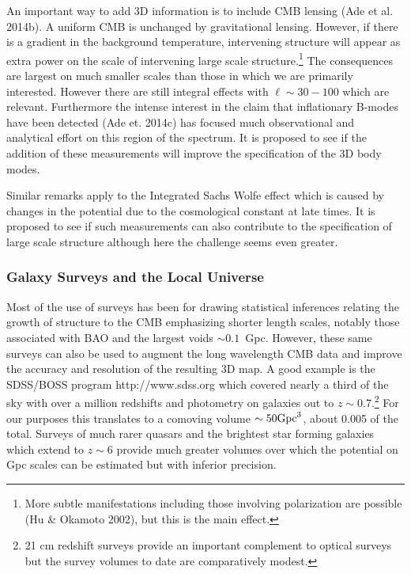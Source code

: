 \documentclass[psfig,11pt]{article}
\begin{document}
An important way to add 3D information is to include CMB lensing (Ade et al. 2014b). A uniform CMB is unchanged by gravitational lensing. However, if there is a gradient in the background temperature, intervening structure will appear as extra power on the scale of intervening large scale structure.\footnote{More subtle manifestations including those involving polarization are possible (Hu \& Okamoto 2002), but this is the main effect.} The consequences are largest on much smaller scales than those in which we are primarily interested. However there are still integral effects with $\ell\sim30-100$ which are relevant. Furthermore the intense interest in the claim that inflationary B-modes have been detected (Ade et. 2014c)  has focused much observational and analytical effort on this region of the spectrum. It is proposed to see if the addition of these measurements will improve the specification of the 3D body modes.

Similar remarks apply to the Integrated Sachs Wolfe effect which is caused by changes in the potential due to the cosmological constant at late times. It is proposed to see if such measurements can also contribute to the specification of large scale structure although here the challenge seems even greater.

\subsubsection{Galaxy Surveys and the Local Universe}

Most of the use of surveys has been for drawing statistical inferences relating the growth of structure to the CMB emphasizing shorter length scales, notably those associated with BAO and the largest voids $\sim0.1$~Gpc. However, these same surveys can also be used to augment the long wavelength CMB data and improve the accuracy and resolution of the resulting 3D map. A good example is the SDSS/BOSS program http://www.sdss.org which covered nearly a third of the sky with over a million redshifts and photometry on galaxies out to $z\sim0.7$.\footnote{21 cm redshift surveys provide an important complement to optical surveys but the survey volumes to date are comparatively modest.} For our purposes this translates to a comoving volume $\sim50{\rm Gpc}^3$, about 0.005 of the total. Surveys of much rarer quasars and the brightest star forming galaxies which extend to  $z\sim6$ provide much greater volumes over which the potential on Gpc scales can be estimated but with inferior precision.
\end{document}

